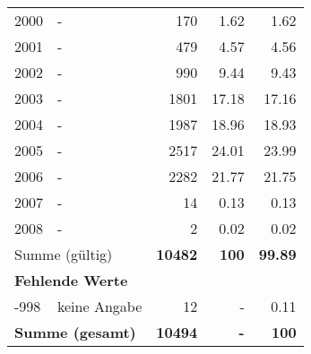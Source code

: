 \begin{longtable}{lXrrr}
        2000 & \multicolumn{1}{X}{-} & %
          \num{170} &
          \num[round-mode=places,round-precision=2]{1,62} &
          \num[round-mode=places,round-precision=2]{1,62} \\

        2001 & \multicolumn{1}{X}{-} & %
          \num{479} &
          \num[round-mode=places,round-precision=2]{4,57} &
          \num[round-mode=places,round-precision=2]{4,56} \\

        2002 & \multicolumn{1}{X}{-} & %
          \num{990} &
          \num[round-mode=places,round-precision=2]{9,44} &
          \num[round-mode=places,round-precision=2]{9,43} \\

        2003 & \multicolumn{1}{X}{-} & %
          \num{1801} &
          \num[round-mode=places,round-precision=2]{17,18} &
          \num[round-mode=places,round-precision=2]{17,16} \\

        2004 & \multicolumn{1}{X}{-} & %
          \num{1987} &
          \num[round-mode=places,round-precision=2]{18,96} &
          \num[round-mode=places,round-precision=2]{18,93} \\

        2005 & \multicolumn{1}{X}{-} & %
          \num{2517} &
          \num[round-mode=places,round-precision=2]{24,01} &
          \num[round-mode=places,round-precision=2]{23,99} \\

        2006 & \multicolumn{1}{X}{-} & %
          \num{2282} &
          \num[round-mode=places,round-precision=2]{21,77} &
          \num[round-mode=places,round-precision=2]{21,75} \\

        2007 & \multicolumn{1}{X}{-} & %
          \num{14} &
          \num[round-mode=places,round-precision=2]{0,13} &
          \num[round-mode=places,round-precision=2]{0,13} \\

        2008 & \multicolumn{1}{X}{-} & %
          \num{2} &
          \num[round-mode=places,round-precision=2]{0,02} &
          \num[round-mode=places,round-precision=2]{0,02} \\

     \midrule
     \multicolumn{2}{l}{Summe (gültig)} &
       \textbf{\num{10482}} &
     \textbf{100} &
       \textbf{\num[round-mode=places,round-precision=2]{99,89}} \\
     \multicolumn{5}{l}{\textbf{Fehlende Werte}}\\
       -998 &
       keine Angabe &
         \num{12} &
        - &
         \num[round-mode=places,round-precision=2]{0,11} \\
     \midrule
     \multicolumn{2}{l}{\textbf{Summe (gesamt)}} &
          \textbf{\num{10494}} &
        \textbf{-} &
        \textbf{100} \\
     \bottomrule
     \end{longtable}
     
